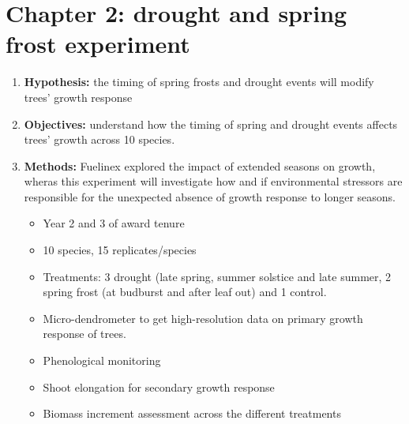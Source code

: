 \documentclass{article}
\begin{document}
\section*{Chapter 2: drought and spring frost experiment}
\begin {enumerate}
	\item \textbf{Hypothesis:} the timing of spring frosts and drought events will modify trees' growth response 
	\item \textbf{Objectives:} understand how the timing of spring and drought events affects trees' growth across 10 species. 
	\item \textbf{Methods:} Fuelinex explored the impact of extended seasons on growth, wheras this experiment will investigate how and if environmental stressors are responsible for the unexpected absence of growth response to longer seasons. 
		\begin {itemize}
			\item Year 2 and 3 of award tenure
			\item 10 species, 15 replicates/species
			\item Treatments: 3 drought (late spring, summer solstice and late summer, 2 spring frost (at budburst and after leaf out) and 1 control. 
			\item Micro-dendrometer to get high-resolution data on primary growth response of trees.
			\item Phenological monitoring 
			\item Shoot elongation for secondary growth response
			\item Biomass increment assessment across the different treatments
		\end{itemize}
\end {enumerate}

\end{document}
